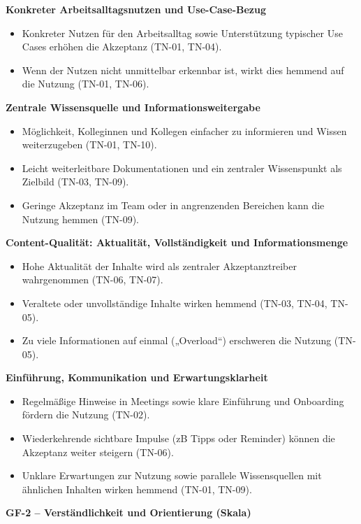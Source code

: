 \textbf{Konkreter Arbeitsalltagsnutzen und Use-Case-Bezug}
\begin{itemize}
  \item Konkreter Nutzen für den Arbeitsalltag sowie Unterstützung typischer Use Cases erhöhen die Akzeptanz 
  (TN-01, TN-04).
  \item Wenn der Nutzen nicht unmittelbar erkennbar ist, wirkt dies hemmend auf die Nutzung 
  (TN-01, TN-06).
\end{itemize}

\textbf{Zentrale Wissensquelle und Informationsweitergabe}
\begin{itemize}
  \item Möglichkeit, Kolleginnen und Kollegen einfacher zu informieren und Wissen weiterzugeben 
  (TN-01, TN-10).
  \item Leicht weiterleitbare Dokumentationen und ein zentraler Wissenspunkt als Zielbild 
  (TN-03, TN-09).
  \item Geringe Akzeptanz im Team oder in angrenzenden Bereichen kann die Nutzung hemmen 
  (TN-09).
\end{itemize}

\textbf{Content-Qualität: Aktualität, Vollständigkeit und Informationsmenge}
\begin{itemize}
  \item Hohe Aktualität der Inhalte wird als zentraler Akzeptanztreiber wahrgenommen 
  (TN-06, TN-07).
  \item Veraltete oder unvollständige Inhalte wirken hemmend 
  (TN-03, TN-04, TN-05).
  \item Zu viele Informationen auf einmal („Overload“) erschweren die Nutzung 
  (TN-05).
\end{itemize}

\textbf{Einführung, Kommunikation und Erwartungsklarheit}
\begin{itemize}
  \item Regelmäßige Hinweise in Meetings sowie klare Einführung und Onboarding fördern die Nutzung 
  (TN-02).
  \item Wiederkehrende sichtbare Impulse (\acrshort{zB} Tipps oder Reminder) können die Akzeptanz weiter steigern 
  (TN-06).
  \item Unklare Erwartungen zur Nutzung sowie parallele Wissensquellen mit ähnlichen Inhalten wirken hemmend 
  (TN-01, TN-09).
\end{itemize}


\vspace{2em}
\textbf{GF-2 -- Verständlichkeit und Orientierung (Skala)}

